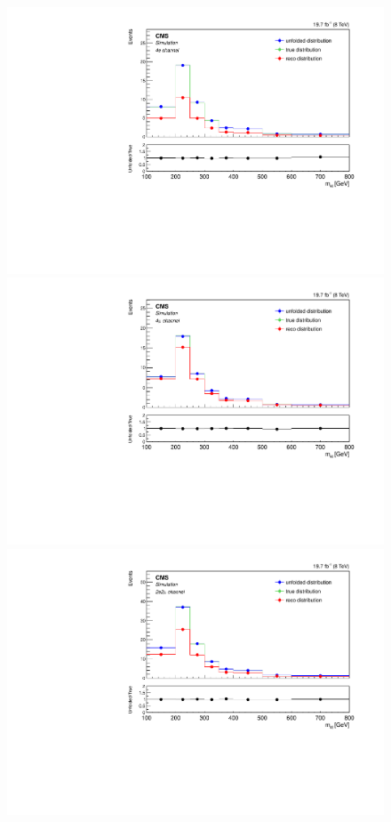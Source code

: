 \begin{figure}[hbtp]
\begin{center}
    \includegraphics[width=0.8\cmsFigWidth]{Figures/Unfolding/MCTests/Mass_ZZTo4e_PowMatrix_PowDistr_HalfSample_fr}     
    \includegraphics[width=0.8\cmsFigWidth]{Figures/Unfolding/MCTests/Mass_ZZTo4m_PowMatrix_PowDistr_HalfSample_fr}     
 \includegraphics[width=0.8\cmsFigWidth]{Figures/Unfolding/MCTests/Mass_ZZTo2e2m_PowMatrix_PowDistr_HalfSample_fr}        

\end{center}
\end{figure}
